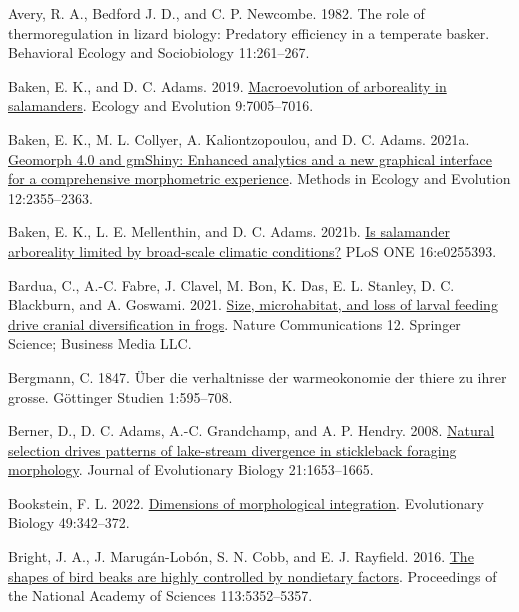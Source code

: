 \documentclass[
  11pt,
]{article}
\newlength{\cslhangindent}
\newlength{\cslentryspacingunit} %
\newenvironment{CSLReferences}[2] %
 {%
  \setlength{\parindent}{0pt}
  \ifodd #1
  \let\oldpar\par
  \def\par{\hangindent=\cslhangindent\oldpar}
  \fi
  \setlength{\parskip}{#2\cslentryspacingunit}
 }%
 {}
\begin{document}
\begin{CSLReferences}{1}{0}
\leavevmode{}%
Avery, R. A., Bedford J. D., and C. P. Newcombe. 1982. The role of
thermoregulation in lizard biology: Predatory efficiency in a temperate
basker. Behavioral Ecology and Sociobiology 11:261--267.

\leavevmode{}%
Baken, E. K., and D. C. Adams. 2019.
\href{https://doi.org/10.1002/ece3.5267}{Macroevolution of arboreality
in salamanders}. Ecology and Evolution 9:7005--7016.

\leavevmode{}%
Baken, E. K., M. L. Collyer, A. Kaliontzopoulou, and D. C. Adams. 2021a.
\href{https://doi.org/10.1111/2041-210X.13723}{Geomorph 4.0 and gmShiny:
Enhanced analytics and a new graphical interface for a comprehensive
morphometric experience}. Methods in Ecology and Evolution
12:2355--2363.

\leavevmode{}%
Baken, E. K., L. E. Mellenthin, and D. C. Adams. 2021b.
\href{https://doi.org/10.1371/journal.pone.0255393}{Is salamander
arboreality limited by broad-scale climatic conditions?} PLoS ONE
16:e0255393.

\leavevmode{}%
Bardua, C., A.-C. Fabre, J. Clavel, M. Bon, K. Das, E. L. Stanley, D. C.
Blackburn, and A. Goswami. 2021.
\href{https://doi.org/10.1038/s41467-021-22792-y}{Size, microhabitat,
and loss of larval feeding drive cranial diversification in frogs}.
Nature Communications 12. Springer Science; Business Media {LLC}.

\leavevmode{}%
Bergmann, C. 1847. {Ü}ber die verhaltnisse der warmeokonomie der thiere
zu ihrer grosse. G{ö}ttinger Studien 1:595--708.

\leavevmode{}%
Berner, D., D. C. Adams, A.-C. Grandchamp, and A. P. Hendry. 2008.
\href{https://doi.org/10.1111/j.1420-9101.2008.01583.x}{Natural
selection drives patterns of lake-stream divergence in stickleback
foraging morphology}. Journal of Evolutionary Biology 21:1653--1665.

\leavevmode{}%
Bookstein, F. L. 2022.
\href{https://doi.org/10.1007/s11692-022-09574-0}{Dimensions of
morphological integration}. Evolutionary Biology 49:342--372.

\leavevmode{}%
Bright, J. A., J. Marugán-Lobón, S. N. Cobb, and E. J. Rayfield. 2016.
\href{https://doi.org/10.1073/pnas.1602683113}{The shapes of bird beaks
are highly controlled by nondietary factors}. Proceedings of the
National Academy of Sciences 113:5352--5357.


\end{CSLReferences}
\end{document}
